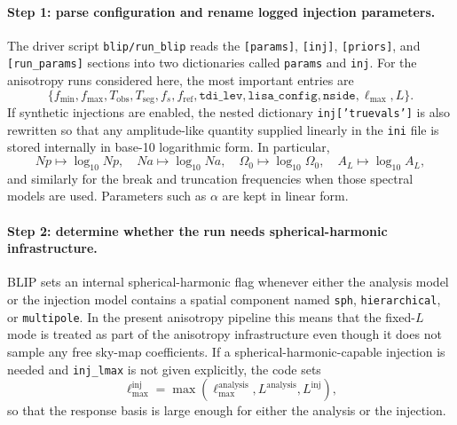 \documentclass[11pt]{article}
\begin{document}
\paragraph{Step 1: parse configuration and rename logged injection parameters.}
The driver script \texttt{blip/run\_blip} reads the \texttt{[params]}, \texttt{[inj]}, \texttt{[priors]}, and \texttt{[run\_params]} sections into two dictionaries called \texttt{params} and \texttt{inj}. For the anisotropy runs considered here, the most important entries are
\begin{equation}
\{f_{\min}, f_{\max}, T_{\mathrm{obs}}, T_{\mathrm{seg}}, f_s, f_{\mathrm{ref}},
\texttt{tdi\_lev}, \texttt{lisa\_config}, \texttt{nside}, \ell_{\max}, L\}.
\end{equation}
If synthetic injections are enabled, the nested dictionary \texttt{inj['truevals']} is also rewritten so that any amplitude-like quantity supplied linearly in the \texttt{ini} file is stored internally in base-10 logarithmic form. In particular,
\begin{equation}
Np \mapsto \log_{10}Np,\quad
Na \mapsto \log_{10}Na,\quad
\Omega_0 \mapsto \log_{10}\Omega_0,\quad
A_L \mapsto \log_{10}A_L,
\end{equation}
and similarly for the break and truncation frequencies when those spectral models are used. Parameters such as $\alpha$ are kept in linear form.

\paragraph{Step 2: determine whether the run needs spherical-harmonic infrastructure.}
BLIP sets an internal spherical-harmonic flag whenever either the analysis model or the injection model contains a spatial component named \texttt{sph}, \texttt{hierarchical}, or \texttt{multipole}. In the present anisotropy pipeline this means that the fixed-$L$ mode is treated as part of the anisotropy infrastructure even though it does not sample any free sky-map coefficients. If a spherical-harmonic-capable injection is needed and \texttt{inj\_lmax} is not given explicitly, the code sets
\begin{equation}
\ell_{\max}^{\mathrm{inj}}
=\max\!\left(\ell_{\max}^{\mathrm{analysis}},L^{\mathrm{analysis}},L^{\mathrm{inj}}\right),
\end{equation}
so that the response basis is large enough for either the analysis or the injection.
\end{document}
